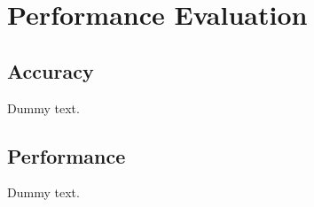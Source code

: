 \chapter{Performance Evaluation}

\section{Accuracy}

Dummy text.

\section{Performance}

Dummy text.